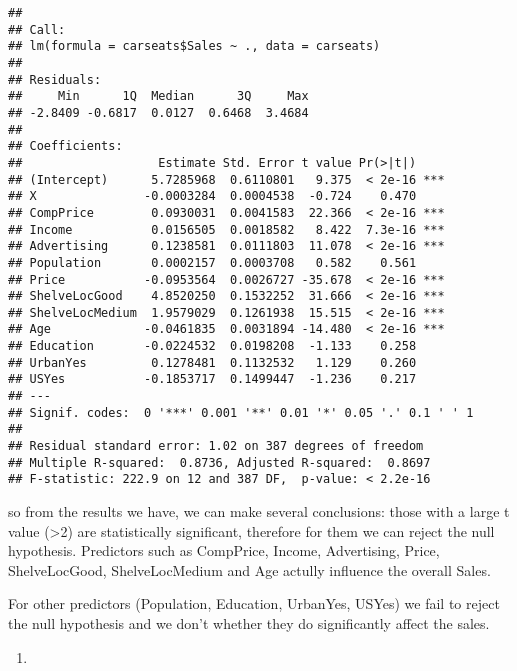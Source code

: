\documentclass[
]{article}
\newenvironment{Shaded}{\begin{snugshade}}{\end{snugshade}}
\newcommand{\FunctionTok}[1]{\textcolor[rgb]{0.13,0.29,0.53}{\textbf{#1}}}
\newcommand{\NormalTok}[1]{#1}
\newcommand{\SpecialCharTok}[1]{\textcolor[rgb]{0.81,0.36,0.00}{\textbf{#1}}}
\providecommand{\tightlist}{%
  \setlength{\itemsep}{0pt}\setlength{\parskip}{0pt}}
\begin{document}
\begin{verbatim}
## 
## Call:
## lm(formula = carseats$Sales ~ ., data = carseats)
## 
## Residuals:
##     Min      1Q  Median      3Q     Max 
## -2.8409 -0.6817  0.0127  0.6468  3.4684 
## 
## Coefficients:
##                   Estimate Std. Error t value Pr(>|t|)    
## (Intercept)      5.7285968  0.6110801   9.375  < 2e-16 ***
## X               -0.0003284  0.0004538  -0.724    0.470    
## CompPrice        0.0930031  0.0041583  22.366  < 2e-16 ***
## Income           0.0156505  0.0018582   8.422  7.3e-16 ***
## Advertising      0.1238581  0.0111803  11.078  < 2e-16 ***
## Population       0.0002157  0.0003708   0.582    0.561    
## Price           -0.0953564  0.0026727 -35.678  < 2e-16 ***
## ShelveLocGood    4.8520250  0.1532252  31.666  < 2e-16 ***
## ShelveLocMedium  1.9579029  0.1261938  15.515  < 2e-16 ***
## Age             -0.0461835  0.0031894 -14.480  < 2e-16 ***
## Education       -0.0224532  0.0198208  -1.133    0.258    
## UrbanYes         0.1278481  0.1132532   1.129    0.260    
## USYes           -0.1853717  0.1499447  -1.236    0.217    
## ---
## Signif. codes:  0 '***' 0.001 '**' 0.01 '*' 0.05 '.' 0.1 ' ' 1
## 
## Residual standard error: 1.02 on 387 degrees of freedom
## Multiple R-squared:  0.8736, Adjusted R-squared:  0.8697 
## F-statistic: 222.9 on 12 and 387 DF,  p-value: < 2.2e-16
\end{verbatim}

so from the results we have, we can make several conclusions: those with
a large t value (\textgreater2) are statistically significant, therefore
for them we can reject the null hypothesis. Predictors such as
CompPrice, Income, Advertising, Price, ShelveLocGood, ShelveLocMedium
and Age actully influence the overall Sales.

For other predictors (Population, Education, UrbanYes, USYes) we fail to
reject the null hypothesis and we don't whether they do significantly
affect the sales.

\begin{enumerate}
\def\labelenumi{\alph{enumi})}
\setcounter{enumi}{4}
\tightlist
\item
\end{enumerate}

\begin{Shaded}
\end{Shaded}
\end{document}
